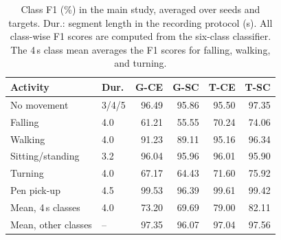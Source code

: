 \begin{table}[t]
\caption{Class F1 (\%) in the main study, averaged over seeds and targets. Dur.: segment length in the recording protocol (s). All class-wise F1 scores are computed from the six-class classifier. The 4\,s class mean averages the F1 scores for falling, walking, and turning.}
\label{tab:class}
\centering\small
\setlength{\tabcolsep}{4pt}
\begin{tabular}{llrrrr}
\toprule
Activity & Dur. & G-CE & G-SC & T-CE & T-SC\\
\midrule
No movement & 3/4/5 & 96.49 & 95.86 & 95.50 & 97.35\\
Falling & 4.0 & 61.21 & 55.55 & 70.24 & 74.06\\
Walking & 4.0 & 91.23 & 89.11 & 95.16 & 96.34\\
Sitting/standing & 3.2 & 96.04 & 95.96 & 96.01 & 95.90\\
Turning & 4.0 & 67.17 & 64.43 & 71.60 & 75.92\\
Pen pick-up & 4.5 & 99.53 & 96.39 & 99.61 & 99.42\\
\midrule
Mean, 4\,s classes & 4.0 & 73.20 & 69.69 & 79.00 & 82.11\\
Mean, other classes & -- & 97.35 & 96.07 & 97.04 & 97.56\\
\bottomrule
\end{tabular}
\end{table}
